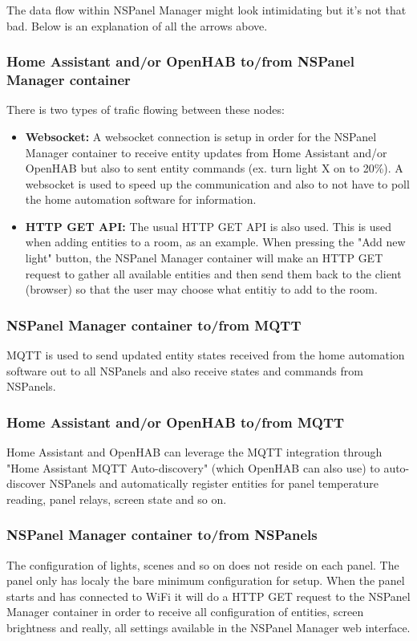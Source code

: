 \documentclass[10pt]{article}
\begin{document}
    The data flow within NSPanel Manager might look intimidating but it's not that bad. Below is an explanation of all the arrows above.

    
    \subsubsection{Home Assistant and/or OpenHAB to/from NSPanel Manager container}
    There is two types of trafic flowing between these nodes:
    \begin{itemize}
      \item \textbf{Websocket:} A websocket connection is setup in order for the NSPanel Manager container to receive entity updates from Home Assistant and/or OpenHAB but also to sent entity commands (ex. turn light X on to 20\%). A websocket is used to speed up the communication and also to not have to poll the home automation software for information.
      \item \textbf{HTTP GET API:} The usual HTTP GET API is also used. This is used when adding entities to a room, as an example. When pressing the "Add new light" button, the NSPanel Manager container will make an HTTP GET request to gather all available entities and then send them back to the client (browser) so that the user may choose what entitiy to add to the room.
    \end{itemize}
    \subsubsection{NSPanel Manager container to/from MQTT}
    MQTT is used to send updated entity states received from the home automation software out to all NSPanels and also receive states and commands from NSPanels.
    \subsubsection{Home Assistant and/or OpenHAB to/from MQTT}
    Home Assistant and OpenHAB can leverage the MQTT integration through "Home Assistant MQTT Auto-discovery" (which OpenHAB can also use) to auto-discover NSPanels and automatically register entities for panel temperature reading, panel relays, screen state and so on.
    \subsubsection{NSPanel Manager container to/from NSPanels}
    The configuration of lights, scenes and so on does not reside on each panel. The panel only has localy the bare minimum configuration for setup. When the panel starts and has connected to WiFi it will do a HTTP GET request to the NSPanel Manager container in order to receive all configuration of entities, screen brightness and really, all settings available in the NSPanel Manager web interface.
\end{document}
